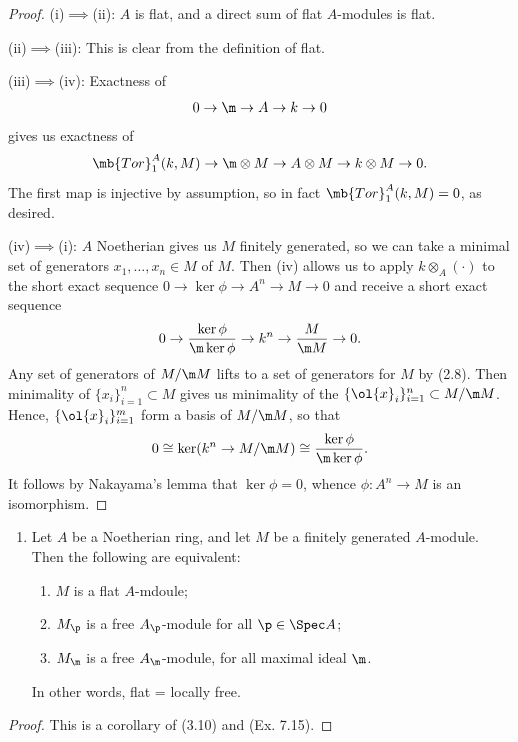 \documentclass[12pt]{amsart}
\newcommand{\Tor}{\mb{Tor}}
\begin{document}
\begin{proof}
  (i)$\implies$(ii):
  $A$ is flat, and a direct sum of flat $A$-modules is flat.

  (ii)$\implies$(iii):
  This is clear from the definition of flat.

  (iii)$\implies$(iv):
  Exactness of
  \[
    0\to\m\to A\to k\to 0
  \] 
  gives us exactness of
  \[
    \Tor^A_1(k,M)\to \m\otimes M\to A\otimes M\to k\otimes M\to 0.
  \] 
  The first map is injective by assumption, so in fact $\Tor^A_1(k,M)=0$, as desired.

  (iv)$\implies$(i):
  $A$ Noetherian gives us $M$ finitely generated, so we can take a minimal set of generators $x_1,\ldots, x_n\in M$ of $M$.
  Then (iv) allows us to apply $k\otimes_A(\cdot)$ to the short exact sequence $0\to\ker\phi\to A^n\to M\to 0$ and receive a short exact sequence
  \[
    0\to \frac{\ker\phi}{\m\ker\phi}\to k^n\to \frac{M}{\m M}\to 0.
  \] 
  Any set of generators of $M/\m M$ lifts to a set of generators for $M$ by (2.8).
  Then minimality of $\{x_i\}_{i=1}^n\subset M$ gives us minimality of the $\{\ol{x}_i\}_{i=1}^n\subset M/\m M$.
  Hence, $\{\ol{x}_i\}_{i=1}^m$ form a basis of $M/\m M$, so that
  \[
    0\cong \ker(k^n\to M/\m M)\cong \frac{\ker\phi}{\m\ker\phi}.
  \] 
  It follows by Nakayama's lemma that $\ker\phi=0$, whence $\phi:A^n\to M$ is an isomorphism.
\end{proof}

\begin{enumerate}
	\item[7.16.] {
      Let $A$ be a Noetherian ring, and let $M$ be a finitely generated $A$-module.
      Then the following are equivalent:
      \begin{enumerate}[label=(\roman*)]
        \item $M$ is a flat $A$-mdoule;
        \item $M_\p$ is a free $A_\p$-module for all $\p\in \Spec A$;
        \item $M_\m$ is a free $A_\m$-module, for all maximal ideal $\m$.
      \end{enumerate}
      In other words, flat = locally free.
    }
\end{enumerate}

\begin{proof}
  This is a corollary of (3.10) and (Ex. 7.15).
\end{proof}
\end{document}
